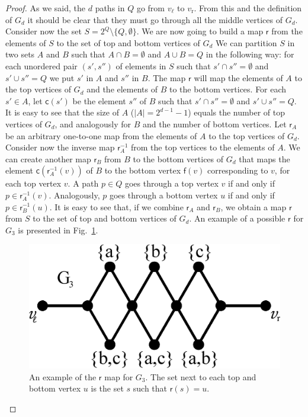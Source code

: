 \ifproof
\begin{proof}
  As we said, the $d$ paths in $Q$  go from $v_\ell$ to $v_\mathrm{r}$.
  From this and the definition of $G_d$ it should be clear that they must go through
  all the middle vertices of $G_d$. Consider now the set
  $S=2^Q\setminus\{Q,\emptyset\}$. We are now going to build a map $\mathsf{r}$
  from the elements of $S$ to the set of top and bottom vertices of $G_d$ We can
  partition $S$ in two sets $A$ and $B$ such that $A\cap B=\emptyset$ and $A\cup
  B=Q$ in the following way: for each unordered pair $(s',s'')$ of
  elements in $S$ such that $s'\cap s''=\emptyset$ and $s'\cup s''=Q$
  we put $s'$ in $A$ and $s''$ in $B$. The map $\mathsf{r}$ will map the
  elements of $A$ to the top vertices of $G_d$ and the elements of $B$ to the
  bottom vertices. For each $s'\in A$, let $\mathsf{c}(s')$ be the element $s''$
  of $B$ such that $s'\cap s''=\emptyset$ and $s'\cup s''=Q$. It is
  easy to see that the size of $A$ ($|A|=2^{d-1}-1$) equals the number of top
  vertices of $G_d$, and analogously for $B$ and the number of bottom vertices.
  Let $\mathsf{r}_A$ be an arbitrary one-to-one map from the elements of $A$ to
  the top vertices of $G_d$. Consider now the inverse map $\mathsf{r}^{-1}_A$
  from the top vertices to the elements of $A$. We can create another map
  $\mathsf{r}_B$ from $B$ to the
  bottom vertices of $G_d$ that maps the element
  $\mathsf{c}(\mathsf{r}^{-1}_A(v))$ of $B$ to the bottom vertex $\mathsf{f}(v)$
  corresponding to $v$, for each top vertex $v$. A path $p\in Q$ goes through
  a top vertex $v$ if and only if $p\in\mathsf{r}^{-1}_A(v)$. Analogously, $p$
  goes through a bottom vertex $u$ if and only if $p\in\mathsf{r}^{-1}_B(u)$.
  It is easy to see that, if we combine $\mathsf{r}_A$ and
  $\mathsf{r}_B$, we obtain a map $\mathsf{r}$ from $S$ to the set of
  top and bottom vertices of $G_d$. An example of a possible $\mathsf{r}$ for
  $G_3$ is presented in Fig.~\ref{fig:mapexample}.

  \begin{figure}[ht]
    \centering
    \includegraphics[scale=0.4]{tight-mapexample}
    \caption{An example of the $\mathsf{r}$ map for $G_3$. The set next to
    each top and bottom vertex $u$ is the set $s$ such that $\mathsf{r}(s)=u$.}
    \label{fig:mapexample}
  \end{figure}
  

\end{proof}
